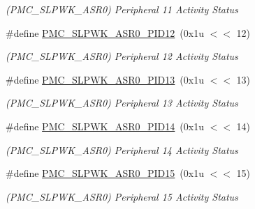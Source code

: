 \begin{DoxyCompactItemize}
\begin{DoxyCompactList}\small\item\em (P\+M\+C\+\_\+\+S\+L\+P\+W\+K\+\_\+\+A\+S\+R0) Peripheral 11 Activity Status \end{DoxyCompactList}\item 
\mbox{\label{group__SAMS70__PMC_gaedffc46071d316bb36e854eff5d0156e}} 
\#define \mbox{\hyperlink{group__SAMS70__PMC_gaedffc46071d316bb36e854eff5d0156e}{P\+M\+C\+\_\+\+S\+L\+P\+W\+K\+\_\+\+A\+S\+R0\+\_\+\+P\+I\+D12}}~(0x1u $<$$<$ 12)
\begin{DoxyCompactList}\small\item\em (P\+M\+C\+\_\+\+S\+L\+P\+W\+K\+\_\+\+A\+S\+R0) Peripheral 12 Activity Status \end{DoxyCompactList}\item 
\mbox{\label{group__SAMS70__PMC_ga682c66ee149768ea3d0d7e5d2865b39a}} 
\#define \mbox{\hyperlink{group__SAMS70__PMC_ga682c66ee149768ea3d0d7e5d2865b39a}{P\+M\+C\+\_\+\+S\+L\+P\+W\+K\+\_\+\+A\+S\+R0\+\_\+\+P\+I\+D13}}~(0x1u $<$$<$ 13)
\begin{DoxyCompactList}\small\item\em (P\+M\+C\+\_\+\+S\+L\+P\+W\+K\+\_\+\+A\+S\+R0) Peripheral 13 Activity Status \end{DoxyCompactList}\item 
\mbox{\label{group__SAMS70__PMC_gaf9d68e9ff1d3e5f08176860aa8c36a46}} 
\#define \mbox{\hyperlink{group__SAMS70__PMC_gaf9d68e9ff1d3e5f08176860aa8c36a46}{P\+M\+C\+\_\+\+S\+L\+P\+W\+K\+\_\+\+A\+S\+R0\+\_\+\+P\+I\+D14}}~(0x1u $<$$<$ 14)
\begin{DoxyCompactList}\small\item\em (P\+M\+C\+\_\+\+S\+L\+P\+W\+K\+\_\+\+A\+S\+R0) Peripheral 14 Activity Status \end{DoxyCompactList}\item 
\mbox{\label{group__SAMS70__PMC_ga17bb92cb5f3622e05eec01c3fca207f3}} 
\#define \mbox{\hyperlink{group__SAMS70__PMC_ga17bb92cb5f3622e05eec01c3fca207f3}{P\+M\+C\+\_\+\+S\+L\+P\+W\+K\+\_\+\+A\+S\+R0\+\_\+\+P\+I\+D15}}~(0x1u $<$$<$ 15)
\begin{DoxyCompactList}\small\item\em (P\+M\+C\+\_\+\+S\+L\+P\+W\+K\+\_\+\+A\+S\+R0) Peripheral 15 Activity Status \end{DoxyCompactList}\item 

\end{DoxyCompactItemize}
